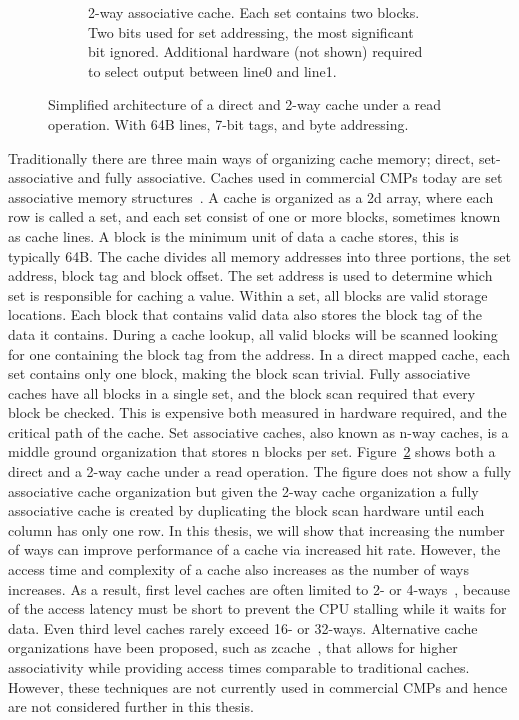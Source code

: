 \begin{figure}
\begin{subfigure}[b]{0.45\textwidth}
        \caption{2-way associative cache. Each set contains two blocks. Two bits used for set addressing, the most significant bit ignored. Additional hardware (not shown) required to select output between line0 and line1.}
        \label{fig:introduction:cache:2way}
    \end{subfigure}
    \caption{Simplified architecture of a direct and 2-way cache under a read operation. With 64B lines, 7-bit tags, and byte addressing.}
    \label{fig:introduction:cache}
\end{figure}

Traditionally there are three main ways of organizing cache memory; direct, set-associative and fully associative.
Caches used in commercial CMPs today are set associative memory structures~\cite{Thomadakis2011, Jain2013, ARM2010, Ho2014}.
A cache is organized as a 2d array, where each row is called a set, and each set consist of one or more blocks, sometimes known as cache lines.
A block is the minimum unit of data a cache stores, this is typically 64B.
The cache divides all memory addresses into three portions, the set address, block tag and block offset.
The set address is used to determine which set is responsible for caching a value.
Within a set, all blocks are valid storage locations.
Each block that contains valid data also stores the block tag of the data it contains.
During a cache lookup, all valid blocks will be scanned looking for one containing the block tag from the address.
In a direct mapped cache, each set contains only one block, making the block scan trivial.
Fully associative caches have all blocks in a single set, and the block scan required that every block be checked.
This is expensive both measured in hardware required, and the critical path of the cache.
Set associative caches, also known as n-way caches, is a middle ground organization that stores n blocks per set.
Figure~\ref{fig:introduction:cache} shows both a direct and a 2-way cache under a read operation.
The figure does not show a fully associative cache organization but given the 2-way cache organization a fully associative cache is created by duplicating the block scan hardware until each column has only one row.
In this thesis, we will show that increasing the number of ways can improve performance of a cache via increased hit rate.
However, the access time and complexity of a cache also increases as the number of ways increases.
As a result, first level caches are often limited to 2- or 4-ways~\cite{Sanchez2010}, because of the access latency must be short to prevent the CPU stalling while it waits for data. 
Even third level caches rarely exceed 16- or 32-ways.
Alternative cache organizations have been proposed, such as zcache~\cite{Sanchez2010}, that allows for higher associativity while providing access times comparable to traditional caches.
However, these techniques are not currently used in commercial CMPs and hence are not considered further in this thesis.


